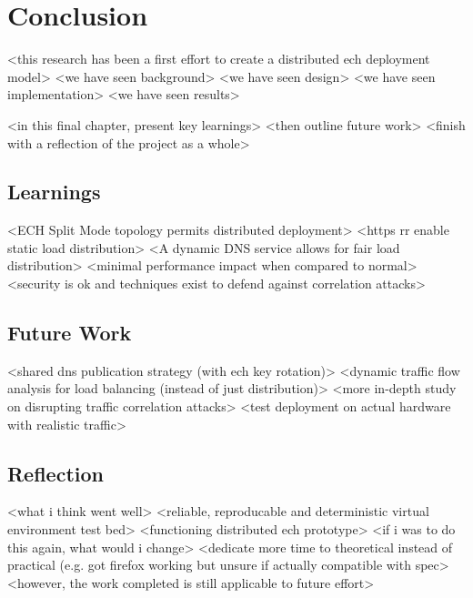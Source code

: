 \chapter{Conclusion}\label{Conclusion}

<this research has been a first effort to create a distributed ech deployment model>
<we have seen background>
<we have seen design>
<we have seen implementation>
<we have seen results>

<in this final chapter, present key learnings>
<then outline future work>
<finish with a reflection of the project as a whole>









\section{Learnings}

<ECH Split Mode topology permits distributed deployment>
<https rr enable static load distribution>
<A dynamic DNS service allows for fair load distribution>
<minimal performance impact when compared to normal>
<security is ok and techniques exist to defend against correlation attacks>









\section{Future Work}

<shared dns publication strategy (with ech key rotation)>
<dynamic traffic flow analysis for load balancing (instead of just distribution)>
<more in-depth study on disrupting traffic correlation attacks>
<test deployment on actual hardware with realistic traffic>








\section{Reflection}

<what i think went well>
<reliable, reproducable and deterministic virtual environment test bed>
<functioning distributed ech prototype>
<if i was to do this again, what would i change>
<dedicate more time to theoretical instead of practical (e.g. got firefox working but unsure if actually compatible with spec>
<however, the work completed is still applicable to future effort>
